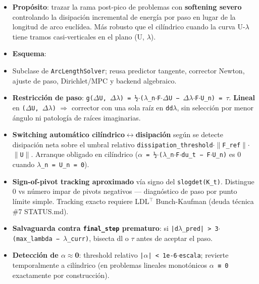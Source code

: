 \documentclass[11pt,letterpaper,oneside]{report}
\begin{document}
\begin{itemize}
  \item \textbf{Propósito}: trazar la rama post-pico de problemas con \textbf{softening severo} controlando la disipación incremental de energía por paso en lugar de la longitud de arco euclídea. Más robusto que el cilíndrico cuando la curva U-\ensuremath{\lambda} tiene tramos casi-verticales en el plano (U, \ensuremath{\lambda}).
  \item \textbf{Esquema}:
  \item Subclase de \texttt{ArcLengthSolver}; reusa predictor tangente, corrector Newton, ajuste de paso, Dirichlet/MPC y backend algebraico.
  \item \textbf{Restricción de paso}: \texttt{g(\ensuremath{\Delta}U, \ensuremath{\Delta}\ensuremath{\lambda}) = ½\ensuremath{\cdot}(\ensuremath{\lambda}\_n\ensuremath{\cdot}F\ensuremath{\cdot}\ensuremath{\Delta}U − \ensuremath{\Delta}\ensuremath{\lambda}\ensuremath{\cdot}F\ensuremath{\cdot}U\_n) = \ensuremath{\tau}}. \textbf{Lineal} en \texttt{(\ensuremath{\Delta}U, \ensuremath{\Delta}\ensuremath{\lambda})} \ensuremath{\Rightarrow} corrector con una sola raíz en \texttt{dd\ensuremath{\lambda}}, sin selección por menor ángulo ni patología de raíces imaginarias.
  \item \textbf{Switching automático cilíndrico\ensuremath{\leftrightarrow}disipación} según se detecte disipación neta sobre el umbral relativo \texttt{dissipation\_threshold\ensuremath{\cdot}\ensuremath{\|}F\_ref\ensuremath{\|}\ensuremath{\cdot}\ensuremath{\|}U\ensuremath{\|}}. Arranque obligado en cilíndrico (\texttt{\ensuremath{\alpha} = ½\ensuremath{\cdot}(\ensuremath{\lambda}\_n\ensuremath{\cdot}F\ensuremath{\cdot}du\_t − F\ensuremath{\cdot}U\_n)} es 0 cuando \texttt{\ensuremath{\lambda}\_n = U\_n = 0}).
  \item \textbf{Sign-of-pivot tracking aproximado} vía signo del \texttt{slogdet(K\_t)}. Distingue 0 vs número impar de pivots negativos --- diagnóstico de paso por punto límite simple. Tracking exacto requiere LDL\ensuremath{^{\top}} Bunch-Kaufman (deuda técnica \#7 STATUS.md).
  \item \textbf{Salvaguarda contra \texttt{final\_step} prematuro}: si \texttt{|d\ensuremath{\lambda}\_pred| > 3\ensuremath{\cdot}(max\_lambda − \ensuremath{\lambda}\_curr)}, bisecta dl o \ensuremath{\tau} antes de aceptar el paso.
  \item \textbf{Detección de \ensuremath{\alpha}\ensuremath{\approx}0}: threshold relativo \texttt{|\ensuremath{\alpha}| < 1e-6\ensuremath{\cdot}escala}; revierte temporalmente a cilíndrico (en problemas lineales monotónicos \texttt{\ensuremath{\alpha} ≡ 0} exactamente por construcción).

\end{itemize}
\end{document}
